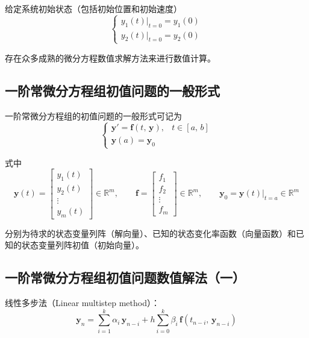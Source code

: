 给定系统初始状态（包括初始位置和初始速度）
\begin{equation*}
\begin{cases}
y_1(t)\big|_{t=0} = y_1(0) \\[4pt]
y_2(t)\big|_{t=0} = y_2(0)
\end{cases}
\end{equation*}

存在众多成熟的微分方程数值求解方法来进行数值计算。


\subsection{一阶常微分方程组初值问题的一般形式}

一阶常微分方程组的初值问题的一般形式可记为
\begin{equation}\label{eq:3.ivp_general}
\begin{cases}
\boldsymbol{y}' = \boldsymbol{f}(t,\, \boldsymbol{y}), & t \in [a,\, b] \\[4pt]
\boldsymbol{y}(a) = \boldsymbol{y}_0
\end{cases}
\end{equation}

式中
\begin{equation}
\boldsymbol{y}(t) = \begin{bmatrix} y_1(t) \\ y_2(t) \\ \vdots \\ y_m(t) \end{bmatrix} \in \mathbb{R}^m, \qquad
\boldsymbol{f} = \begin{bmatrix} f_1 \\ f_2 \\ \vdots \\ f_m \end{bmatrix} \in \mathbb{R}^m, \qquad
\boldsymbol{y}_0 = \boldsymbol{y}(t)\big|_{t=a} \in \mathbb{R}^m
\end{equation}

分别为待求的状态变量列阵（解向量）、已知的状态变化率函数（向量函数）和已知的状态变量列阵初值（初始向量）。


\subsection{一阶常微分方程组初值问题数值解法（一）}

线性多步法（Linear multistep method）：
\begin{equation}\label{eq:3.linear_multistep}
\boldsymbol{y}_n = \sum_{i=1}^{k} \alpha_i\, \boldsymbol{y}_{n-i} + h \sum_{i=0}^{k} \beta_i\, \boldsymbol{f}(t_{n-i},\, \boldsymbol{y}_{n-i})
\end{equation}


